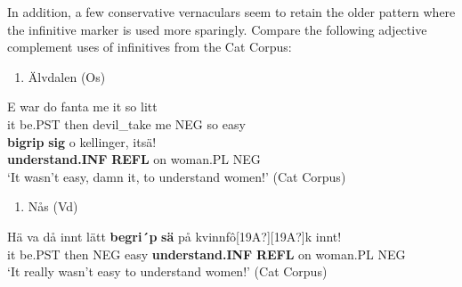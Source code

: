 In addition, a few conservative vernaculars seem to retain the older pattern where the infinitive marker is used more sparingly. Compare the following adjective complement uses of infinitives from the Cat Corpus:

\begin{enumerate} %
\item 
Älvdalen (Os)

\end{enumerate} %
\ea\label{}
\gll E  war  do  fanta  me  it  so  litt\\


it  be.PST  then  devil\_take  me  NEG  so  easy\\ %


\ea\label{}
\gll \textbf{bigrip} \textbf{sig} o  kellinger,  itsä!\\


\textbf{understand.INF} \textbf{REFL} on  woman.PL  NEG\\ %


 ‘It wasn’t easy, damn it, to understand women!’ (Cat Corpus)
\z


\begin{enumerate} %
\item 
Nås (Vd)

\end{enumerate} %
\ea\label{}
\gll Hä  va  då  innt  lätt  \textbf{begri´p} \textbf{sä} på  kvinnfô[19A?][19A?]k  innt!\\


it  be.PST  then  NEG  easy  \textbf{understand.INF} \textbf{REFL} on  woman.PL  NEG\\ %


‘It really wasn’t easy to understand women!’ (Cat Corpus)
\z



